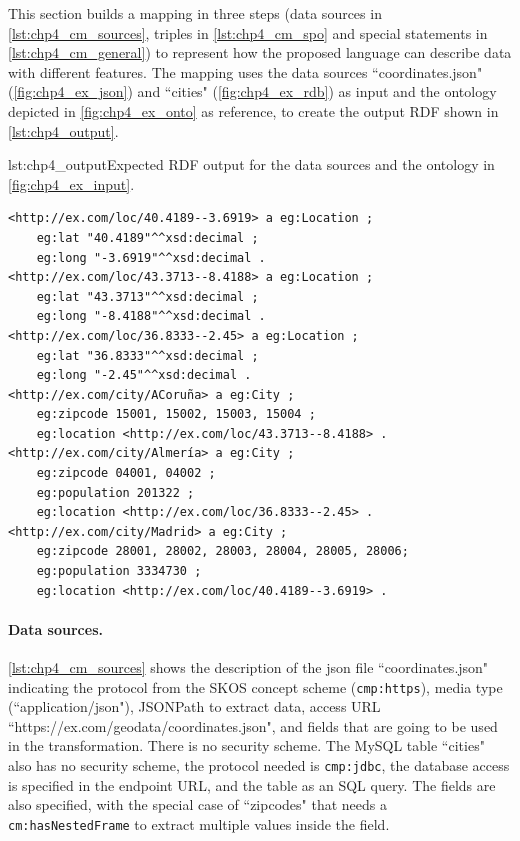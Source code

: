 

This section builds a mapping in three steps (data sources in \cref{lst:chp4_cm_sources}, triples in \cref{lst:chp4_cm_spo} and special statements in \cref{lst:chp4_cm_general}) to represent how the proposed language can describe data with different features. The mapping uses the data sources ``coordinates.json" (\cref{fig:chp4_ex_json}) and ``cities" (\cref{fig:chp4_ex_rdb}) as input and the ontology depicted in  \cref{fig:chp4_ex_onto} as reference, to create the output RDF shown in \cref{lst:chp4_output}. 

\begin{captionedlisting}{lst:chp4_output}{Expected RDF output for the data sources and the ontology in \cref{fig:chp4_ex_input}.}
\centering
{\begin{lstlisting}[]
<http://ex.com/loc/40.4189--3.6919> a eg:Location ;
	eg:lat "40.4189"^^xsd:decimal ;
	eg:long "-3.6919"^^xsd:decimal .
<http://ex.com/loc/43.3713--8.4188> a eg:Location ;
	eg:lat "43.3713"^^xsd:decimal ;
	eg:long "-8.4188"^^xsd:decimal .
<http://ex.com/loc/36.8333--2.45> a eg:Location ;
	eg:lat "36.8333"^^xsd:decimal ;
	eg:long "-2.45"^^xsd:decimal .
<http://ex.com/city/ACoruña> a eg:City ;
	eg:zipcode 15001, 15002, 15003, 15004 ;
	eg:location <http://ex.com/loc/43.3713--8.4188> .
<http://ex.com/city/Almería> a eg:City ;
	eg:zipcode 04001, 04002 ;
	eg:population 201322 ;
	eg:location <http://ex.com/loc/36.8333--2.45> .
<http://ex.com/city/Madrid> a eg:City ;
	eg:zipcode 28001, 28002, 28003, 28004, 28005, 28006;
	eg:population 3334730 ;
	eg:location <http://ex.com/loc/40.4189--3.6919> .
\end{lstlisting}}
\end{captionedlisting}

\noindent\paragraph{\textbf{Data sources.}} \cref{lst:chp4_cm_sources} shows the description of the json file ``coordinates.json" indicating the protocol from the SKOS concept scheme (\texttt{cmp:https}), media type (``application/json"), JSONPath to extract data, access URL  ``https://ex.com/geodata/coordi\-nates.json", and  fields that are going to be used in the transformation. There is no security scheme. The MySQL table ``cities" also has no security scheme, the protocol needed is \texttt{cmp:jdbc}, the database access is specified in the endpoint URL, and the table as an SQL query. The fields are also specified, with the special case of ``zipcodes" that needs a \texttt{cm:hasNestedFrame} to extract multiple values inside the field.

